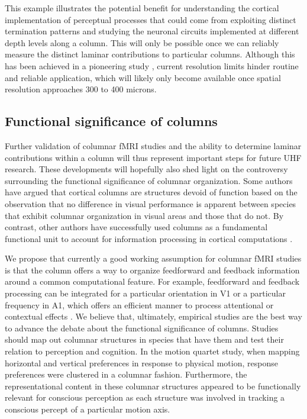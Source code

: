 This example illustrates the potential benefit for understanding the cortical implementation of perceptual processes that could come from exploiting distinct termination patterns and studying the neuronal circuits implemented at different depth levels along a column. This will only be possible once we can reliably measure the distinct laminar contributions to particular columns. Although this has been achieved in a pioneering study \parencite{DeMartino2015}, current resolution limits hinder routine and reliable application, which will likely only become available once spatial resolution approaches 300 to 400 microns.

\subsection{Functional significance of columns}
Further validation of columnar fMRI studies and the ability to determine laminar contributions within a column will thus represent important steps for future UHF research. These developments will hopefully also shed light on the controversy surrounding the functional significance of columnar organization. Some authors have argued that cortical columns are structures devoid of function \parencite{Horton2005} based on the observation that no difference in visual performance is apparent between species that exhibit columnar organization in visual areas and those that do not. By contrast, other authors have successfully used columns as a fundamental functional unit to account for information processing in cortical computations \parencite{Bastos2012}.

We propose that currently a good working assumption for columnar fMRI studies is that the column offers a way to organize feedforward and feedback information around a common computational feature. For example, feedforward and feedback processing can be integrated for a particular orientation in V1 or a particular frequency in A1, which offers an efficient manner to process attentional or contextual effects \parencite{DeMartino2015}. We believe that, ultimately, empirical studies are the best way to advance the debate about the functional significance of columns. Studies should map out columnar structures in species that have them and test their relation to perception and cognition. In the motion quartet study, when mapping horizontal and vertical preferences in response to physical motion, response preferences were clustered in a columnar fashion. Furthermore, the representational content in these columnar structures appeared to be functionally relevant for conscious perception as each structure was involved in tracking a conscious percept of a particular motion axis.

